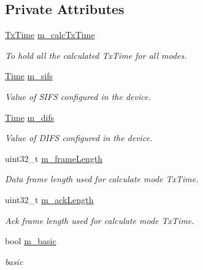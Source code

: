 \subsection*{Private Attributes}
\begin{DoxyCompactItemize}
\item 
\hyperlink{classns3_1_1RraaWifiManager_aa37f727b4afc496e624c72c43afc36bf}{Tx\+Time} \hyperlink{classns3_1_1RraaWifiManager_a8be7a8dc357c20ee9d0da6714fd994c9}{m\+\_\+calc\+Tx\+Time}
\begin{DoxyCompactList}\small\item\em To hold all the calculated Tx\+Time for all modes. \end{DoxyCompactList}\item 
\hyperlink{classns3_1_1Time}{Time} \hyperlink{classns3_1_1RraaWifiManager_ae7fe056435d03395ea3a010ce57a27c7}{m\+\_\+sifs}
\begin{DoxyCompactList}\small\item\em Value of S\+I\+FS configured in the device. \end{DoxyCompactList}\item 
\hyperlink{classns3_1_1Time}{Time} \hyperlink{classns3_1_1RraaWifiManager_a584da119999317e3e0020f4b5ed921b5}{m\+\_\+difs}
\begin{DoxyCompactList}\small\item\em Value of D\+I\+FS configured in the device. \end{DoxyCompactList}\item 
uint32\+\_\+t \hyperlink{classns3_1_1RraaWifiManager_a43b8fc3fb7d677b03aaaf6803149b99e}{m\+\_\+frame\+Length}
\begin{DoxyCompactList}\small\item\em Data frame length used for calculate mode Tx\+Time. \end{DoxyCompactList}\item 
uint32\+\_\+t \hyperlink{classns3_1_1RraaWifiManager_ad99aa645ea8516cfa020d22facb7934d}{m\+\_\+ack\+Length}
\begin{DoxyCompactList}\small\item\em Ack frame length used for calculate mode Tx\+Time. \end{DoxyCompactList}\item 
bool \hyperlink{classns3_1_1RraaWifiManager_a6855666708a35311f3bd02d614fffc8f}{m\+\_\+basic}
\begin{DoxyCompactList}\small\item\em basic \end{DoxyCompactList}\item 

\end{DoxyCompactItemize}
